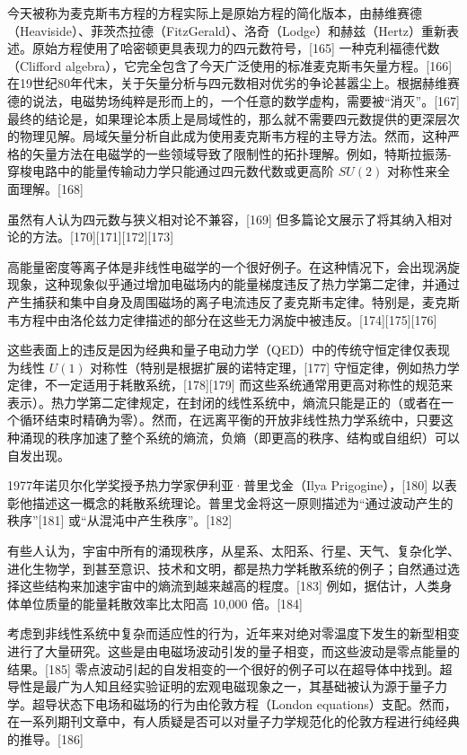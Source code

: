 今天被称为麦克斯韦方程的方程实际上是原始方程的简化版本，由赫维赛德（Heaviside）、菲茨杰拉德（FitzGerald）、洛奇（Lodge）和赫兹（Hertz）重新表述。原始方程使用了哈密顿更具表现力的四元数符号，[165] 一种克利福德代数（Clifford algebra），它完全包含了今天广泛使用的标准麦克斯韦矢量方程。[166] 在19世纪80年代末，关于矢量分析与四元数相对优劣的争论甚嚣尘上。根据赫维赛德的说法，电磁势场纯粹是形而上的，一个任意的数学虚构，需要被“消灭”。[167] 最终的结论是，如果理论本质上是局域性的，那么就不需要四元数提供的更深层次的物理见解。局域矢量分析自此成为使用麦克斯韦方程的主导方法。然而，这种严格的矢量方法在电磁学的一些领域导致了限制性的拓扑理解。例如，特斯拉振荡-穿梭电路中的能量传输动力学只能通过四元数代数或更高阶 \( SU(2) \) 对称性来全面理解。[168]  

虽然有人认为四元数与狭义相对论不兼容，[169] 但多篇论文展示了将其纳入相对论的方法。[170][171][172][173]

高能量密度等离子体是非线性电磁学的一个很好例子。在这种情况下，会出现涡旋现象，这种现象似乎通过增加电磁场内的能量梯度违反了热力学第二定律，并通过产生捕获和集中自身及周围磁场的离子电流违反了麦克斯韦定律。特别是，麦克斯韦方程中由洛伦兹力定律描述的部分在这些无力涡旋中被违反。[174][175][176]  

这些表面上的违反是因为经典和量子电动力学（QED）中的传统守恒定律仅表现为线性 \( U(1) \) 对称性（特别是根据扩展的诺特定理，[177] 守恒定律，例如热力学定律，不一定适用于耗散系统，[178][179] 而这些系统通常用更高对称性的规范来表示）。热力学第二定律规定，在封闭的线性系统中，熵流只能是正的（或者在一个循环结束时精确为零）。然而，在远离平衡的开放非线性热力学系统中，只要这种涌现的秩序加速了整个系统的熵流，负熵（即更高的秩序、结构或自组织）可以自发出现。

1977年诺贝尔化学奖授予热力学家伊利亚·普里戈金（Ilya Prigogine），[180] 以表彰他描述这一概念的耗散系统理论。普里戈金将这一原则描述为“通过波动产生的秩序”[181] 或“从混沌中产生秩序”。[182]  

有些人认为，宇宙中所有的涌现秩序，从星系、太阳系、行星、天气、复杂化学、进化生物学，到甚至意识、技术和文明，都是热力学耗散系统的例子；自然通过选择这些结构来加速宇宙中的熵流到越来越高的程度。[183] 例如，据估计，人类身体单位质量的能量耗散效率比太阳高 10,000 倍。[184]

考虑到非线性系统中复杂而适应性的行为，近年来对绝对零温度下发生的新型相变进行了大量研究。这些是由电磁场波动引发的量子相变，而这些波动是零点能量的结果。[185] 零点波动引起的自发相变的一个很好的例子可以在超导体中找到。超导性是最广为人知且经实验证明的宏观电磁现象之一，其基础被认为源于量子力学。超导状态下电场和磁场的行为由伦敦方程（London equations）支配。然而，在一系列期刊文章中，有人质疑是否可以对量子力学规范化的伦敦方程进行纯经典的推导。[186]  

